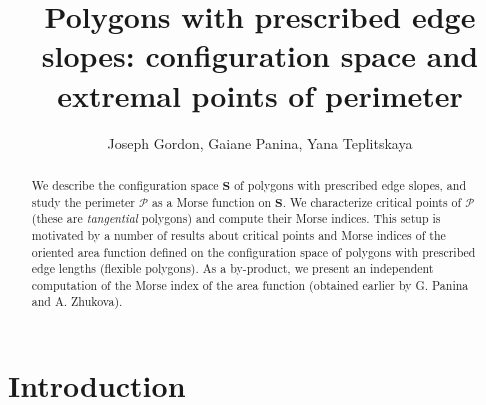 \documentclass[12pt]{amsart}
\theoremstyle{plain}
\theoremstyle{definition}
\theoremstyle{remark}
\theoremstyle{plain}
\theoremstyle{definition}
\begin{document}
\title[Polygons with prescribed edge slopes]{Polygons with prescribed edge slopes: configuration space and extremal points of  perimeter}


\author{ Joseph Gordon, Gaiane Panina, Yana Teplitskaya}



\address[Joseph Gordon]{Mathematics \& Mechanics Department, St. Petersburg State University; e-mail: joseph-gordon@yandex.ru}
\address[Gaiane Panina]{Mathematics \& Mechanics Department, St. Petersburg State University; St. Petersburg Department of Steklov Mathematical Institute; e-mail: gaiane-panina@rambler.ru}
\address[Yana Teplitskaya]{Chebyshev Laboratory, St. Petersburg State University, 14th Line V.O., 29B, Saint Petersburg 199178 Russia; e-mail:
janejashka@gmail.com}





\begin{abstract}We describe the configuration space $\mathbf{S}$ of polygons with prescribed edge slopes, and study the
perimeter  $\mathcal{P}$  as a Morse function on $\mathbf{S}$. We characterize  critical points of  $\mathcal{P}$ (these are \textit{tangential} polygons) and compute their Morse indices.  This setup is motivated by a number of results about  critical points and Morse indices of the oriented area function defined on the configuration space of polygons with prescribed edge lengths (flexible polygons). As a by-product, we present an independent computation of the Morse index of the area function (obtained earlier by  G. Panina and A. Zhukova).
\end{abstract}





\maketitle



\section{Introduction}
\end{document}
